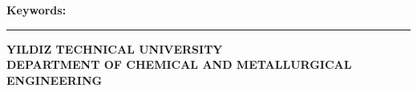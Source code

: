 \abstractTextEnglish

{\bfseries Keywords:} \abstractKeywordsEnglish

\vfill


\begin{center}
\rule{0.99\textwidth}{.1pt}
    
\bfseries \small
 YILDIZ TECHNICAL UNIVERSITY\\
 DEPARTMENT OF CHEMICAL AND METALLURGICAL ENGINEERING
 \end{center}

\fi
\fi


\onehalfspacing
\clearpage
{}
